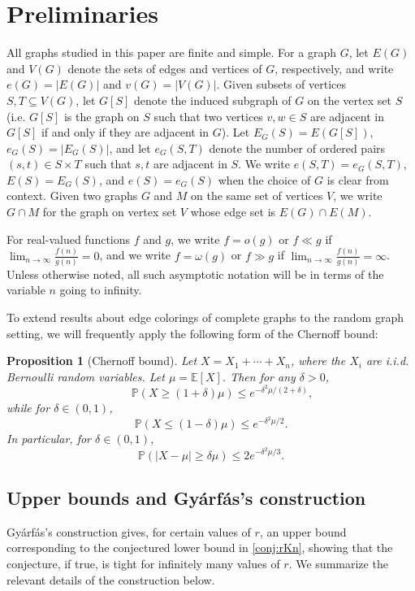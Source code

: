 \documentclass[12pt]{amsart}
\newtheorem{prop}[theorem]{Proposition}
\theoremstyle{definition}
\numberwithin{equation}{section}
\newcommand{\EE}{\mathbb{E}}
\newcommand{\PP}{\mathbb{P}}
\begin{document}
\section{Preliminaries} \label{sec:prelims}
All graphs studied in this paper are finite and simple.
For a graph $G$, let $E(G)$ and $V(G)$ denote the sets of edges and vertices of $G$, respectively, and write $e(G)=|E(G)|$ and $v(G)=|V(G)|$. 
Given subsets of vertices $S,T\subseteq V(G)$, let $G[S]$ denote the induced subgraph of $G$ on the vertex set $S$ (i.e. $G[S]$ is the graph on $S$ such that two vertices $v,w\in S$ are adjacent in $G[S]$ if and only if they are adjacent in $G$). Let $E_G(S)=E(G[S])$, $e_G(S)=|E_G(S)|$, and let $e_G(S,T)$ denote the number of ordered pairs $(s,t)\in S\times T$ such that $s,t$ are adjacent in $S$. We write $e(S,T)=e_G(S,T)$, $E(S)=E_G(S)$, and $e(S)=e_G(S)$ when the choice of $G$ is clear from context. Given two graphs $G$ and $M$ on the same set of vertices $V$, we write $G\cap M$ for the graph on vertex set $V$ whose edge set is $E(G)\cap E(M)$.


For real-valued functions $f$ and $g$, we write $f=o(g)$ or $f\ll g$ if $\lim_{n\to \infty}\frac{f(n)}{g(n)} = 0$, and we write $f=\omega(g)$ or $f\gg g$ if $\lim_{n\to\infty}\frac{f(n)}{g(n)} = \infty$. Unless otherwise noted, all such asymptotic notation will be in terms of the variable $n$ going to infinity.


To extend results about edge colorings of complete graphs to the random graph setting, we will frequently apply the following form of the Chernoff bound:
\begin{prop}[Chernoff bound]
    \label{prop:chernoff}
    Let $X=X_1+\cdots+X_n$, where the $X_i$ are i.i.d. Bernoulli random variables. Let $\mu=\EE[X]$. Then for any $\delta > 0$,
    \[
        \qquad \PP(X \ge (1+\delta) \mu)\le e^{-\delta^2 \mu/(2+\delta)},
    \]
    while for $\delta \in (0, 1)$,
    \[
        \PP(X \le (1-\delta) \mu)\le e^{-\delta^2 \mu/2}.
    \]
    In particular, for $\delta \in (0,1)$,
    \[\PP(|X-\mu|\ge \delta \mu)\le 2e^{-\delta^2 \mu/3}.\]
\end{prop}

\subsection{Upper bounds and Gy\'arf\'as's construction}
Gy\'arf\'as's construction \cite{gya} gives, for certain values of $r$, an upper bound corresponding to the conjectured lower bound in \cref{conj:rKn}, showing that the conjecture, if true, is tight for infinitely many values of $r$. We summarize the relevant details of the construction below.
\end{document}
